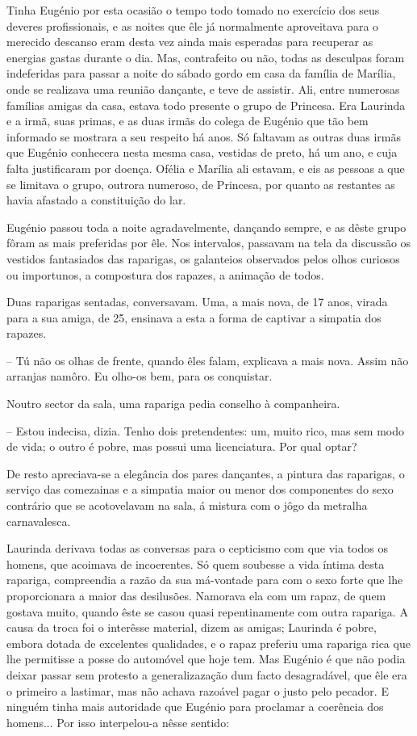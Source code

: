 \documentclass[9pt]{article}
\begin{document}
Tinha Eugé\-nio por esta ocasião o tempo todo tomado no exercício dos
seus deveres profissionais, e as noites que êle já normalmente aproveitava
para o merecido descanso eram desta vez ainda mais esperadas para recuperar as energias gastas durante o dia. Mas, contrafeito ou não, todas as
desculpas foram indeferidas para passar a noite do sábado gordo em casa
da fa\-mí\-lia de Marília, onde se realizava uma reunião dan\-çante, e teve de
assistir. Ali, entre numerosas fa\-mí\-lias amigas da casa, estava todo presente o grupo de Princesa. Era Laurinda e a irmã, suas primas, e as duas
irmãs do colega de Eugé\-nio que tão bem informado se mostrara a seu respeito há anos. Só faltavam as outras duas irmãs que Eugé\-nio conhecera
nesta mesma casa, vestidas de preto, há um ano, e cuja falta justifi\-caram
por doença. Ofélia e Marília ali estavam, e eis as pessoas a que se limitava o grupo, outrora numeroso, de Princesa, por quanto as restantes as havia afastado a constitui\-ção do lar.

Eugé\-nio passou toda a noite agradavelmente, dan\-çando sempre, e as dêste grupo fôram as mais preferidas por êle. Nos intervalos, passavam na
 tela da discussão os vestidos fantasiados das raparigas, os galanteios
observados pelos o\-lhos curiosos ou importunos, a compostura dos rapazes,
a anima\-ção de todos.

Duas raparigas sentadas, conversavam. Uma, a mais nova, de 17 anos, virada para a sua amiga, de 25, ensinava a esta a forma de captivar
a simpatia dos rapazes.

-- Tú não os o\-lhas de frente, quan\-do êles falam, explicava a mais nova. Assim não arranjas namôro. Eu o\-lho-os bem, para os conquistar.

Noutro sector da  sala, uma rapariga pedia conse\-lho à companheira.

-- Estou indecisa, dizia. Tenho dois pretendentes: um, muito rico, mas sem
modo de vida; o outro é pobre, mas possui uma licenciatura. Por qual
optar?

De resto apreciava-se a elegância dos pares dan\-çantes, a pintura
das raparigas, o serviço das comezainas e a simpatia maior ou menor dos
componentes do sexo contrário que se acotovelavam na sala, á mistura com
o jôgo da metra\-lha carnavalesca.

Laurinda derivava todas as conversas para o cepticismo com que via
todos os homens, que acoimava de incoerentes. Só quem soubesse a vida
íntima desta rapariga, compreendia a razão da sua má-vontade para com o sexo forte que
\-lhe proporcionara a maior das desilusões. Namorava ela com um rapaz, de
quem gostava muito, quan\-do êste se casou quasi repentinamente com outra
rapariga. A causa da troca foi o interêsse material, dizem as amigas;
Laurinda é pobre, embora dotada de excelentes qualidades, e o rapaz preferiu uma rapariga rica que lhe permitisse a posse do automóvel que hoje
tem. Mas Eugé\-nio é que não podia deixar passar sem protesto a generalizaza\-ção dum facto desa\-gra\-dá\-vel, que êle era o primeiro a lastimar, mas não
achava razoável pagar o justo pelo pecador. E nin\-guém tinha mais autoridade que Eugé\-nio para proclamar a coerência dos homens... Por isso
interpelou-a nêsse sentido:
\end{document}
